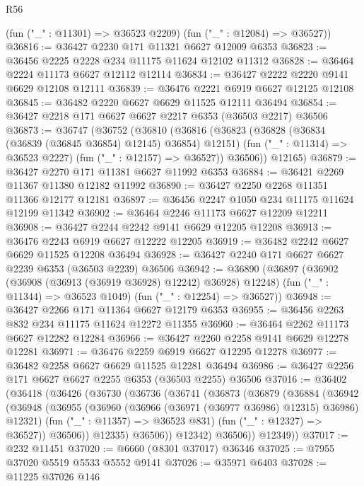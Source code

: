 \begin{lexlean}{R56}
\begin{coremodule}
      (fun ("_" : @11301) => @36523 @2209)
      (fun ("_" : @12084) => @36527))
@36816 := @36427 @2230 @171 @11321 @6627 @12009 @6353
@36823 := @36456 @2225 @2228 @234 @11175 @11624 @12102 @11312
@36828 := @36464 @2224 @11173 @6627 @12112 @12114
@36834 := @36427 @2222 @2220 @9141 @6629 @12108 @12111
@36839 := @36476 @2221 @6919 @6627 @12125 @12108
@36845 := @36482 @2220 @6627 @6629 @11525 @12111 @36494
@36854 := @36427 @2218 @171 @6627 @6627 @2217 @6353 (@36503 @2217) @36506
@36873 := @36747
    (@36752
      (@36810
        (@36816
          (@36823
            (@36828 (@36834 (@36839 (@36845 @36854) @12145) @36854) @12151)
            (fun ("_" : @11314) => @36523 @2227)
            (fun ("_" : @12157) => @36527))
          @36506))
      @12165)
@36879 := @36427 @2270 @171 @11381 @6627 @11992 @6353
@36884 := @36421 @2269 @11367 @11380 @12182 @11992
@36890 := @36427 @2250 @2268 @11351 @11366 @12177 @12181
@36897 := @36456 @2247 @1050 @234 @11175 @11624 @12199 @11342
@36902 := @36464 @2246 @11173 @6627 @12209 @12211
@36908 := @36427 @2244 @2242 @9141 @6629 @12205 @12208
@36913 := @36476 @2243 @6919 @6627 @12222 @12205
@36919 := @36482 @2242 @6627 @6629 @11525 @12208 @36494
@36928 := @36427 @2240 @171 @6627 @6627 @2239 @6353 (@36503 @2239) @36506
@36942 := @36890
    (@36897
      (@36902 (@36908 (@36913 (@36919 @36928) @12242) @36928) @12248)
      (fun ("_" : @11344) => @36523 @1049)
      (fun ("_" : @12254) => @36527))
@36948 := @36427 @2266 @171 @11364 @6627 @12179 @6353
@36955 := @36456 @2263 @832 @234 @11175 @11624 @12272 @11355
@36960 := @36464 @2262 @11173 @6627 @12282 @12284
@36966 := @36427 @2260 @2258 @9141 @6629 @12278 @12281
@36971 := @36476 @2259 @6919 @6627 @12295 @12278
@36977 := @36482 @2258 @6627 @6629 @11525 @12281 @36494
@36986 := @36427 @2256 @171 @6627 @6627 @2255 @6353 (@36503 @2255) @36506
@37016 := @36402
    (@36418
      (@36426
        (@36730
          (@36736
            (@36741
              (@36873
                (@36879
                  (@36884
                    (@36942
                      (@36948
                        (@36955
                          (@36960 (@36966 (@36971 (@36977 @36986) @12315) @36986) @12321)
                          (fun ("_" : @11357) => @36523 @831)
                          (fun ("_" : @12327) => @36527))
                        @36506))
                    @12335)
                  @36506))
              @12342)
            @36506))
        @12349))
@37017 := @232 @11451
@37020 := @6660 (@8301 @37017) @36346
@37025 := @7955 @37020 @5519 @5533 @5552 @9141
@37026 := @35971 @6403
@37028 := @11225 @37026 @146

\end{coremodule}
\end{lexlean}
